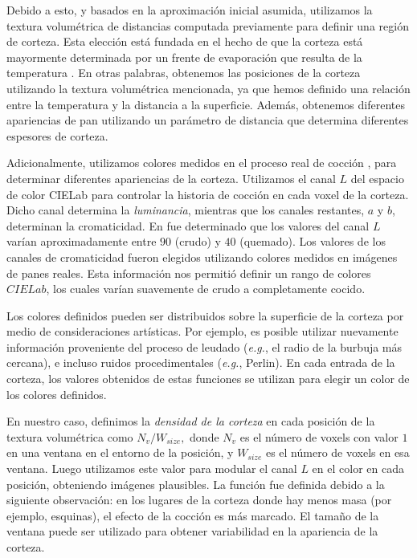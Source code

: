 Debido a esto, y basados en la aproximación inicial asumida, utilizamos la textura volumétrica de distancias computada previamente para definir una región de corteza.
Esta elección está fundada en el hecho de que la corteza está mayormente determinada por un frente de evaporación que resulta de la temperatura \cite{Jefferson2007}.
En otras palabras, obtenemos las posiciones de la corteza utilizando la textura volumétrica mencionada, ya que hemos definido una relación entre la temperatura y la distancia a la superficie.
Además, obtenemos diferentes apariencias de pan utilizando un parámetro de distancia que determina diferentes espesores de corteza.

Adicionalmente, utilizamos colores medidos en el proceso real de cocción \cite{Purlis2009}, para determinar diferentes apariencias de la corteza.
Utilizamos el canal $L$ del espacio de color CIELab \cite{Hunter58} para controlar la historia de cocción en cada voxel de la corteza.
Dicho canal determina la {\em luminancia}, mientras que los canales restantes, $a$ y $b$, determinan la cromaticidad.
En \cite{Purlis2009} fue determinado que los valores del canal $L$ varían aproximadamente entre $90$ (crudo) y $40$ (quemado).
Los valores de los canales de cromaticidad fueron elegidos utilizando colores medidos en imágenes de panes reales.
Esta información nos permitió definir un rango de colores $CIELab$, los cuales varían suavemente de crudo a completamente cocido. 

Los colores definidos pueden ser distribuidos sobre la superficie de la corteza por medio de consideraciones artísticas.
Por ejemplo, es posible utilizar nuevamente información proveniente del proceso de leudado ({\em e.g.}, el radio de la burbuja más cercana), e incluso ruidos procedimentales ({\em e.g.}, Perlin).
En cada entrada de la corteza, los valores obtenidos de estas funciones se utilizan para elegir un color de los colores definidos.

En nuestro caso, definimos la {\em densidad de la corteza} en cada posición de la textura volumétrica como $N_{v} / W_{size},$ donde $N_{v}$ es el número de voxels con valor $1$ en una ventana en el entorno de la posición, y $W_{size}$ es el número de voxels en esa ventana.
Luego utilizamos este valor para modular el canal $L$ en el color en cada posición, obteniendo imágenes plausibles.
La función fue definida debido a la siguiente observación: en los lugares de la corteza donde hay menos masa (por ejemplo, esquinas), el efecto de la cocción es más marcado.
El tamaño de la ventana puede ser utilizado para obtener variabilidad en la apariencia de la corteza.


